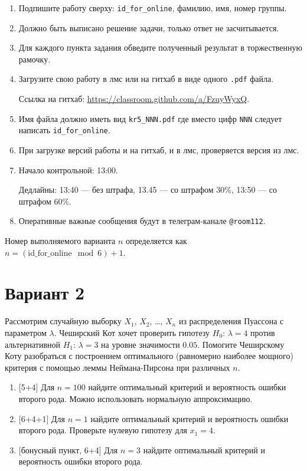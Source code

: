 \documentclass[12pt]{article}
\newcommand \id {\mathrm{id}\_\mathrm{for}\_\mathrm{online}}
\begin{document}
\begin{enumerate}
\item Подпишите работу сверху: \verb|id_for_online|, фамилию, имя, номер группы.
\item Должно быть выписано решение задачи, только ответ не засчитывается.
\item Для каждого пункта задания обведите полученный результат в торжественную рамочку.
\item Загрузите свою работу в лмс или на гитхаб в виде одного \verb|.pdf| файла.

Ссылка на гитхаб: \url{https://classroom.github.com/a/FzuyWyxQ}.
\item Имя файла должно иметь вид \verb|kr5_NNN.pdf| где вместо цифр \verb|NNN| следует написать \verb|id_for_online|.
\item При загрузке версий работы и на гитхаб, и в лмс, проверяется версия из лмс. 
\item Начало контрольной: 13:00. 

Дедлайны: 13:40 — без штрафа, 13.45 — со штрафом 30\%, 13:50 — со штрафом 60\%.
\item Оперативные важные сообщения будут в телеграм-канале \verb|@room112|.
\end{enumerate}


\newpage

Номер выполняемого варианта $n$ определяется как $n=(\id \mod 6)+1$. 

\section*{Вариант 2}


Рассмотрим случайную выборку $X_1$, $X_2$, \ldots, $X_n$ из распределения Пуассона с параметром $\lambda$. 
Чеширский Кот хочет проверить гипотезу $H_0$: $\lambda = 4$ против альтернативной $H_1$: $\lambda = 3$ на уровне
значимости $0.05$. Помогите Чеширскому Коту разобраться с построением оптимального (равномерно наиболее мощного)
критерия с помощью леммы Неймана-Пирсона при различных $n$.

\begin{enumerate}
  \item {[5+4]} Для $n=100$ найдите оптимальный критерий и вероятность ошибки второго рода. Можно использовать нормальную аппроксимацию.
  \item {[6+4+1]} Для $n=1$ найдите оптимальный критерий и вероятность ошибки второго рода. Проверьте нулевую гипотезу для $x_1 = 4$. 
  \item {[бонусный пункт, 6+4]} Для $n=3$ найдите оптимальный критерий и вероятность ошибки второго рода.
\end{enumerate}
\end{document}
